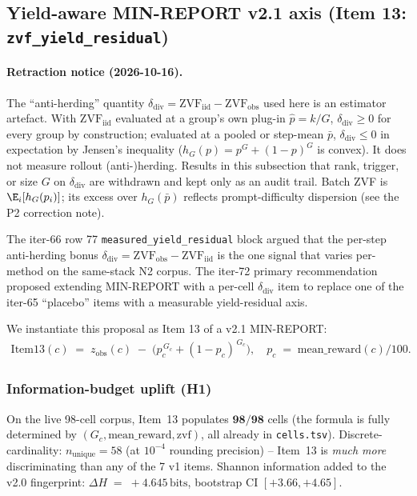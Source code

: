 \subsection{Yield-aware MIN-REPORT v2.1 axis (Item 13: \texttt{zvf\_yield\_residual})}
\label{sec:p5-iter80-yield}

\paragraph{Retraction notice (2026-10-16).} The ``anti-herding'' quantity
$\delta_{\mathrm{div}}=\mathrm{ZVF}_{\mathrm{iid}}-\mathrm{ZVF}_{\mathrm{obs}}$
used here is an estimator artefact. With $\mathrm{ZVF}_{\mathrm{iid}}$
evaluated at a group's own plug-in $\hat p=k/G$, $\delta_{\mathrm{div}}\ge0$
for every group by construction; evaluated at a pooled or step-mean $\bar p$,
$\delta_{\mathrm{div}}\le0$ in expectation by Jensen's inequality ($h_G(p)=p^G+(1-p)^G$
is convex). It does not measure rollout (anti-)herding. Results in this
subsection that rank, trigger, or size $G$ on $\delta_{\mathrm{div}}$ are
withdrawn and kept only as an audit trail. Batch ZVF is $\E_i[h_G(p_i)]$; its
excess over $h_G(\bar p)$ reflects prompt-difficulty dispersion (see the P2
correction note).


The iter-66 row 77 \texttt{measured\_yield\_residual} block argued that the
per-step anti-herding bonus
$\delta_{\mathrm{div}} = \mathrm{ZVF}_{\mathrm{obs}} - \mathrm{ZVF}_{\mathrm{iid}}$ is the
one signal that varies per-method on the same-stack N2 corpus. The
iter-72 primary recommendation proposed extending MIN-REPORT with a
per-cell $\delta_{\mathrm{div}}$ item to replace one of the iter-65
``placebo'' items with a measurable yield-residual axis.

We instantiate this proposal as Item 13 of a v2.1 MIN-REPORT:
\begin{align}
  \mathrm{Item13}(c) \;=\; z_{\mathrm{obs}}(c) \;-\; \bigl(p_c^{\,G_c} + (1-p_c)^{\,G_c}\bigr),
\quad p_c \;=\; \mathrm{mean\_reward}(c)/100.
\label{eq:item13}
\end{align}

\subsubsection{Information-budget uplift (H1)}
On the live 98-cell corpus, Item~13 populates $\mathbf{98/98}$ cells (the
formula is fully determined by $(G_c, \mathrm{mean\_reward}, \mathrm{zvf})$,
all already in \texttt{cells.tsv}). Discrete-cardinality:
$n_{\mathrm{unique}} = 58$ (at $10^{-4}$ rounding precision) -- Item~13 is
\emph{much more} discriminating than any of the 7 v1 items. Shannon
information added to the v2.0 fingerprint:
$\Delta H \;=\; +4.645\,\mathrm{bits}$, bootstrap CI $[+3.66, +4.65]$.


